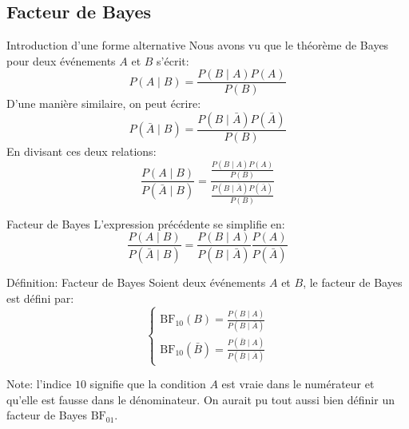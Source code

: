 \subsection{Facteur de Bayes}

\begin{frame}{Introduction d'une forme alternative}
	Nous avons vu que le théorème de Bayes pour deux événements $A$ et $B$ s'écrit:
	\begin{equation}
		P(A \mid B) = \frac{P(B \mid A) P(A)}{P(B)}
		\nonumber
	\end{equation}
	\pause
	D'une manière similaire, on peut écrire:
	\begin{equation}
		P(\bar{A} \mid B) = \frac{P(B \mid \bar{A}) P(\bar{A})}{P(B)}
		\nonumber
	\end{equation}
	\pause
	En divisant ces deux relations:
	\begin{equation}
		\frac{P(A \mid B)}{P(\bar{A} \mid B)} = \frac{\frac{P(B \mid A) P(A)}{P(B)}}{\frac{P(B \mid \bar{A}) P(\bar{A})}{P(B)}}
		\nonumber
	\end{equation}	
\end{frame}

\begin{frame}{Facteur de Bayes}
	L'expression précédente se simplifie en:
	\begin{equation}
		\frac{P(A \mid B)}{P(\bar{A} \mid B)} = \frac{P(B \mid A)}{P(B \mid \bar{A})} \frac{P(A)}{P(\bar{A})}
		\nonumber
	\end{equation}
	\begin{block}{Définition: Facteur de Bayes}
		Soient deux événements $A$ et $B$, le facteur de Bayes est défini par:
		\begin{equation}
			\begin{cases}
				\text{BF}_{10}(B) = \displaystyle \frac{P(B \mid A)}{P(B \mid \bar{A})} \\[10pt]
				\text{BF}_{10}(\bar{B}) = \displaystyle \frac{P(\bar{B} \mid A)}{P(\bar{B} \mid \bar{A})}
			\end{cases}
			\nonumber
		\end{equation}
	\end{block}
	Note: l'indice $10$ signifie que la condition $A$ est vraie dans le numérateur et qu'elle est fausse dans le dénominateur. On aurait pu tout aussi bien définir un facteur de Bayes $\text{BF}_{01}$.
\end{frame}

